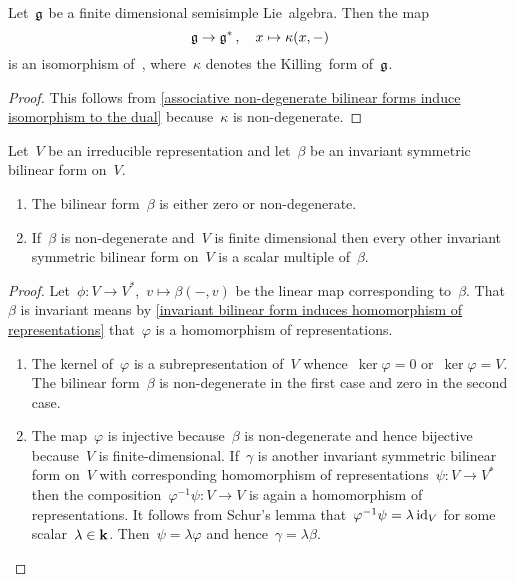 \begin{lemma}
  \label{semisimple lie algebra identification with dual space}
  Let~$\glie$ be a finite dimensional semisimple Lie~algebra.
  Then the map
  \[
    \mathfrak{g}
    \to
    \mathfrak{g}^* \,,
    \quad
    x
    \mapsto
    \kappa(x,-)
  \]
  is an isomorphism of~{\representations{$\glie$}}, where~$\kappa$ denotes the Killing~form of~$\glie$.
\end{lemma}


\begin{proof}
  This follows from \cref{associative non-degenerate bilinear forms induce isomorphism to the dual} because~$\kappa$ is non-degenerate.
\end{proof}


\begin{lemma}
  \label{bilinear form on irreducible}
  Let~$V$ be an irreducible representation and let~$\beta$ be an invariant symmetric bilinear form on~$V$.
  \begin{enumerate}
    \item
      The bilinear form~$\beta$ is either zero or non-degenerate.
    \item
      If~$\beta$ is non-degenerate and~$V$ is finite dimensional then every other invariant symmetric bilinear form on~$V$ is a scalar multiple of~$\beta$.
  \end{enumerate}
\end{lemma}


\begin{proof}
  Let~$\phi \colon V \to V^*$,~$v \mapsto \beta(-,v)$ be the linear map corresponding to~$\beta$.
  That~$\beta$ is invariant means by \cref{invariant bilinear form induces homomorphism of representations} that~$\varphi$ is a homomorphism of representations.
  \begin{enumerate}
    \item
      The kernel of~$\varphi$ is a subrepresentation of~$V$ whence~$\ker \varphi = 0$ or~$\ker \varphi = V$.
      The bilinear form~$\beta$ is non-degenerate in the first case and zero in the second case.
    \item
      The map~$\varphi$ is injective because~$\beta$ is non-degenerate and hence bijective because~$V$ is finite-dimensional.
      If~$\gamma$ is another invariant symmetric bilinear form on~$V$ with corresponding homomorphism of representations~$\psi \colon V \to V^*$ then the composition~$\varphi^{-1} \psi \colon V \to V$ is again a homomorphism of representations.
      It follows from Schur’s lemma that~$\varphi^{-1} \psi = \lambda \operatorname{id}_V$ for some scalar~$\lambda \in \mathbf{k}$.
      Then~$\psi = \lambda \varphi$ and hence~$\gamma = \lambda \beta$.
    \qedhere
  \end{enumerate}
\end{proof}


